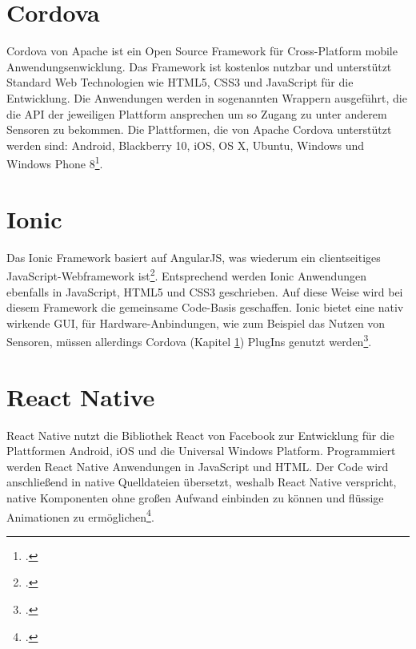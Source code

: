 \section{Cordova} \label{chpCordova}

Cordova von Apache ist ein Open Source Framework für Cross-Platform mobile Anwendungsenwicklung. Das Framework ist kostenlos nutzbar und unterstützt Standard Web Technologien wie HTML5, CSS3 und JavaScript für die Entwicklung. Die Anwendungen werden in sogenannten Wrappern ausgeführt, die die API der jeweiligen Plattform ansprechen um so Zugang zu unter anderem Sensoren zu bekommen. Die Plattformen, die von Apache Cordova unterstützt werden sind: Android, Blackberry 10, iOS, OS X, Ubuntu, Windows und Windows Phone 8\footcite{Cordova}. 

\section{Ionic}

Das Ionic Framework basiert auf AngularJS, was wiederum ein clientseitiges JavaScript-Webframework ist\footcite{AngularJS}. Entsprechend werden Ionic Anwendungen ebenfalls in JavaScript, HTML5 und CSS3 geschrieben. Auf diese Weise wird bei diesem Framework die gemeinsame Code-Basis geschaffen. Ionic bietet eine nativ wirkende GUI, für Hardware-Anbindungen, wie zum Beispiel das Nutzen von Sensoren, müssen allerdings Cordova (Kapitel  \ref{chpCordova}) PlugIns genutzt werden\footcite{Ionic}. 

\section{React Native}

React Native nutzt die Bibliothek React von Facebook zur Entwicklung für die Plattformen Android, iOS und die Universal Windows Platform. Programmiert werden React Native Anwendungen in JavaScript und HTML. Der Code wird anschließend in native Quelldateien übersetzt, weshalb React Native verspricht, native Komponenten ohne großen Aufwand einbinden zu können und flüssige Animationen zu ermöglichen\footcite{EinerFuerAlles}.